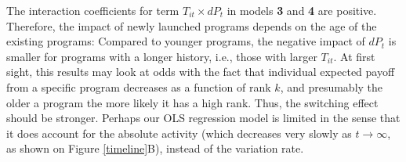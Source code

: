 The interaction coefficients for term $T_{it} \times dP_t$ in models {\bf 3} and {\bf 4} are positive. Therefore, the impact of newly launched programs depends on the age of the existing programs: Compared to younger programs, the negative impact of $dP_t$ is smaller for programs with a longer history, i.e., those with larger $T_{it}$. At first sight, this results may look at odds with the fact that individual expected payoff from a specific program decreases as a function of rank $k$, and presumably the older a program the more likely it has a high rank. Thus, the switching effect should be stronger. Perhaps our OLS regression model is limited in the sense that it does account for the absolute activity (which decreases very slowly as $t \rightarrow \infty$, as shown on Figure \ref{timeline}B), instead of the variation rate.

